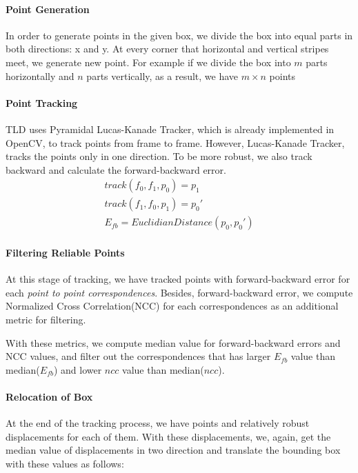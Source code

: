 \documentclass{report}
\begin{document}
        \paragraph{Point Generation}
            In order to generate points in the given box, we divide the box into equal
            parts in both directions: x and y. At every corner that horizontal and vertical stripes meet, we generate
            new point. For example if we divide the box into $m$ parts horizontally and $n$ parts vertically, as a result,
            we have $m \times n$ points
        \paragraph{Point Tracking}
            TLD uses Pyramidal Lucas-Kanade Tracker, which is already implemented in OpenCV, to track points from frame
            to frame. However, Lucas-Kanade Tracker, tracks the points only in one direction. To be more robust,
            we also track backward and calculate the forward-backward error.
            \begin{gather}
                track(f_{0}, f_{1}, p_{0}) = p_{1} \\
                track(f_{1}, f_{0}, p_{1}) = p_{0}' \\
                E_{fb} = EuclidianDistance(p_{0}, p_{0}')
            \end{gather}
        \paragraph{Filtering Reliable Points}
            At this stage of tracking, we have tracked points with forward-backward error
            for each \textit{point to point correspondences}. Besides, forward-backward error, we compute
            Normalized Cross Correlation(NCC) for each correspondences as an additional metric for filtering.

            With these metrics, we compute median value for forward-backward errors and NCC values, and filter out
            the correspondences that has larger $E_{fb}$ value than median($E_{fb}$) and
            lower $ncc$ value than median($ncc$).

        \paragraph{Relocation of Box}
            At the end of the tracking process, we have points and relatively robust displacements for each of them.
            With these displacements, we, again, get the median value of displacements in two direction and translate
            the bounding box with these values as follows:
\end{document}
